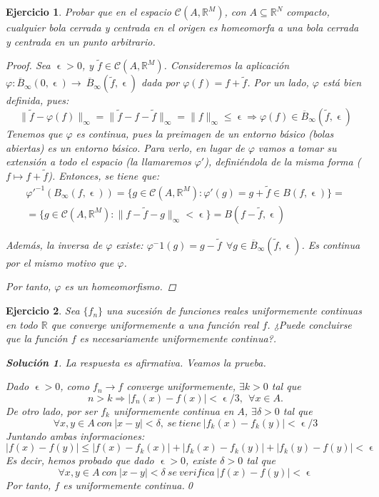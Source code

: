 \documentclass[11pt, a4paper]{article}
\let\epsilon\upvarepsilon
\newcommand{\R}{\mathbb{R}}
\theoremstyle{theorem-style}
\theoremstyle{definition-style}
\newtheorem{ejer}{Ejercicio}[section]
\theoremstyle{remark-style}
\newtheorem*{sol}{Solución}
\theoremstyle{example-style}
\begin{document}
\begin{ejer} Probar que en el espacio $\mathcal{C}(A,\mathbb{R}^M)$, con $A \subseteq \mathbb{R}^N$ compacto, cualquier bola cerrada y centrada en el origen es homeomorfa a una bola cerrada y centrada en un punto arbitrario.

  \begin{proof}
    Sea $\epsilon > 0$, y $\tilde f \in \mathcal C (A, \mathbb{R}^M)$. Consideremos la aplicación $\varphi: \overline{B}_\infty(0,\epsilon) \to \ \overline{B}_\infty(\tilde f, \epsilon) $ dada por $\varphi(f) = f + \tilde f$.
    Por un lado, $\varphi$ está bien definida, pues: $$\|\tilde f - \varphi(f) \|_\infty= \| \tilde f - f - \tilde f \|_\infty = \|f\|_\infty \le \epsilon \Rightarrow \varphi(f) \in \overline{B}_\infty(\tilde f, \epsilon)$$
    Tenemos que $\varphi$ es continua, pues la preimagen de un entorno básico (bolas abiertas) es un entorno básico. Para verlo, en lugar de $\varphi$ vamos a tomar su extensión a todo el espacio (la llamaremos $\varphi'$), definiéndola de la misma forma ($f \mapsto f+\tilde f$). Entonces, se tiene que:
    \[
      \begin{array}{l}
	\varphi'^{-1}(B_\infty(f, \epsilon)) = \{ g\in \mathcal{C}(A,\R^M) : \varphi'(g) = g + 	\tilde f \in B(f, \epsilon)\} =\\
	= \{ g\in \mathcal{C}(A,\R^M) : \|f-\tilde f-g\|_\infty < \epsilon\} = B(f-\tilde f,\epsilon)
      \end{array}
    \]


    Además, la inversa de $\varphi$ existe: $\varphi^-1(g) = g - \tilde f\ \ \forall g \in \overline{B}_\infty(\tilde f, \epsilon)$. Es continua por el mismo motivo que $\varphi$.

    Por tanto, $\varphi$ es un homeomorfismo.
  \end{proof}	
\end{ejer}

\begin{ejer}
  
  Sea $\{ f_n \}$ una sucesión de funciones reales uniformemente continuas en todo $\mathbb R$ que converge uniformemente a una función real $f$. ¿Puede concluirse que  la función $f$ es necesariamente uniformemente continua?. 

  \begin{sol}
    La respuesta es afirmativa. Veamos la prueba.
    
    Dado $\epsilon>0$, como $f_n \rightarrow f$ converge uniformemente, $\exists k>0$
    tal que $$n>k \Rightarrow |f_n(x)-f(x)| < \epsilon/3, \ \ \forall x \in A.$$
    De otro lado, por ser $f_k$ uniformemente continua en $A$, 
    $\exists \delta >0$ tal que $$\forall x,y \in A\ con\ |x-y| < \delta,\ se\ tiene\ |f_k(x)-f_k(y)| < \epsilon /3$$
    Juntando ambas informaciones: $$|f(x)-f(y)| \leq |f(x)-f_k(x)| + |f_k(x)-f_k(y)| + |f_k(y)-f(y)| < \epsilon$$
    Es decir, hemos probado que dado $\epsilon>0$, existe $\delta>0$ tal que $$\forall x,y \in A\ con\ |x-y|<\delta\ se\ verifica\ |f(x)-f(y)| < \epsilon$$ 
    Por tanto, $f$ es uniformemente continua.\qed
  \end{sol}
\end{ejer}
\end{document}
